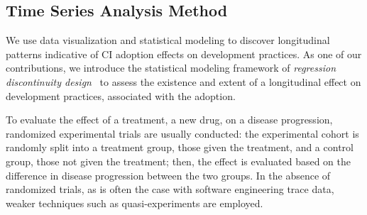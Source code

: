 
\subsection{Time Series Analysis Method}
\label{sec:tsa}

We use data visualization and statistical modeling to discover longitudinal 
patterns indicative of CI adoption effects on development practices.
As one of our contributions, we introduce the statistical modeling 
framework of \emph{regression discontinuity design}~\cite{imbens2008regression} 
to assess the existence and extent of a longitudinal effect on development 
practices, associated with the \Tvis adoption.

To evaluate the effect of a treatment, \eg a new drug, on a disease progression, 
randomized experimental trials are usually conducted: the experimental 
cohort is randomly split into a treatment group, \ie those given the treatment, 
and a control group, \ie those not given the treatment; 
then, the effect is evaluated based on the difference in disease progression 
between the two groups.
In the absence of randomized trials, as is often the case with software 
engineering trace data, weaker techniques such as quasi-experiments are 
employed.





